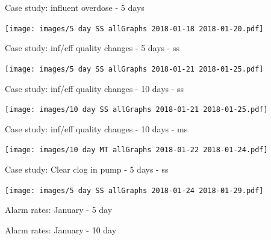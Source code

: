 \documentclass{beamer}
\begin{document}
\begin{frame}{Case study: influent overdose - 5 days}
\protect\hypertarget{case-study-influent-overdose---5-days}{}

\texttt{[image: images/5 day SS allGraphs 2018-01-18 2018-01-20.pdf]}

\end{frame}

\begin{frame}{Case study: inf/eff quality changes - 5 days - ss}
\protect\hypertarget{case-study-infeff-quality-changes---5-days---ss}{}

\texttt{[image: images/5 day SS allGraphs 2018-01-21 2018-01-25.pdf]}

\end{frame}

\begin{frame}{Case study: inf/eff quality changes - 10 days - ss}
\protect\hypertarget{case-study-infeff-quality-changes---10-days---ss}{}

\texttt{[image: images/10 day SS allGraphs 2018-01-21 2018-01-25.pdf]}

\end{frame}

\begin{frame}{Case study: inf/eff quality changes - 10 days - ms}
\protect\hypertarget{case-study-infeff-quality-changes---10-days---ms}{}

\texttt{[image: images/10 day MT allGraphs 2018-01-22 2018-01-24.pdf]}

\end{frame}

\begin{frame}{Case study: Clear clog in pump - 5 days - ss}
\protect\hypertarget{case-study-clear-clog-in-pump---5-days---ss}{}

\texttt{[image: images/5 day SS allGraphs 2018-01-24 2018-01-29.pdf]}

\end{frame}

\begin{frame}{Alarm rates: January - 5 day}
\protect\hypertarget{alarm-rates-january---5-day}{}

\end{frame}

\begin{frame}{Alarm rates: January - 10 day}
\protect\hypertarget{alarm-rates-january---10-day}{}

\end{frame}
\end{document}
